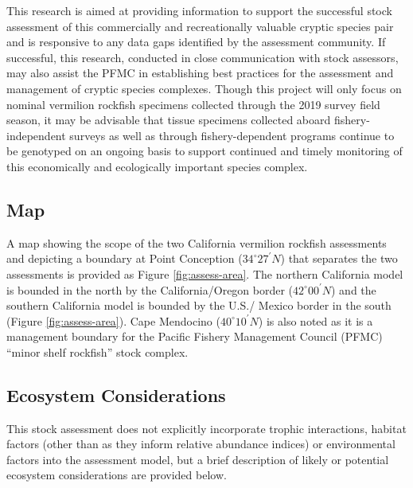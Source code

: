 \documentclass[11pt,
  english,
]{article}
\begin{document}
This research is aimed at providing information to support the successful stock assessment of this commercially and recreationally valuable cryptic species pair and is responsive to any data gaps identified by the assessment community. If successful, this research, conducted in close communication with stock assessors, may also assist the PFMC in establishing best practices for the assessment and management of cryptic species complexes. Though this project will only focus on nominal vermilion rockfish specimens collected through the 2019 survey field season, it may be advisable that tissue specimens collected aboard fishery-independent surveys as well as through fishery-dependent programs continue to be genotyped on an ongoing basis to support continued and timely monitoring of this economically and ecologically important species complex.


\hypertarget{map}{%
\subsection{Map}\label{map}}

\leavevmode\tagmcend\tagstructend

A map showing the scope of the two California vermilion rockfish assessments and depicting a boundary at Point Conception ($34^\circ 27^\prime N$) that separates the two assessments is provided as Figure \ref{fig:assess-area}. The northern California model is bounded in the north by the California/Oregon border ($42^\circ 00^\prime N$) and the southern California model is bounded by the U.S./ Mexico border in the south (Figure \ref{fig:assess-area}). Cape Mendocino ($40^\circ 10^\prime N$) is also noted as it is a management boundary for the Pacific Fishery Management Council (PFMC) ``minor shelf rockfish'' stock complex.


\hypertarget{ecosystem-considerations-1}{%
\subsection{Ecosystem Considerations}\label{ecosystem-considerations-1}}

\leavevmode\tagmcend\tagstructend

This stock assessment does not explicitly incorporate trophic interactions, habitat factors (other than as they inform relative abundance indices) or environmental factors into the assessment model, but a brief description of likely or potential ecosystem considerations are provided below.
\end{document}
